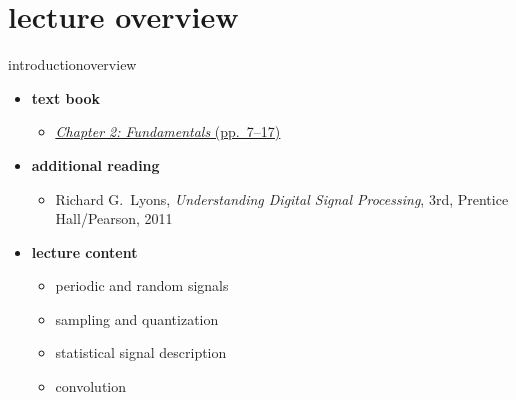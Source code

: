 

\subtitle{Part 3.1: Fundamentals I}


	

    \section[overview]{lecture overview}
        \begin{frame}{introduction}{overview}
            \begin{itemize}
                \item   \textbf{text book}  
                    \begin{itemize}
                        \item   \href{http://ieeexplore.ieee.org/xpl/articleDetails.jsp?tp=&arnumber=6331119&}{\underline{\textit{Chapter 2: Fundamentals} (pp.~7--17)}}
                    \end{itemize}
                \item   \textbf{additional reading}  
                    \begin{itemize}
                        \item   Richard G.~Lyons, \textit{Understanding Digital Signal Processing}, 3rd, Prentice Hall/Pearson, 2011
                    \end{itemize}
                \bigskip
                \item<2->   \textbf{lecture content}
                    \begin{itemize}
                        \item<2->   periodic and random signals
                        \item<3->   sampling and quantization
                        \item<4->   statistical signal description
                        \item<5->   convolution
                    \end{itemize}
            \end{itemize}
        \end{frame}
        
